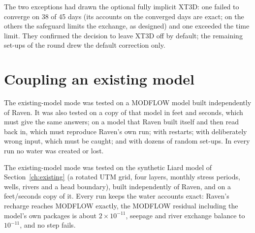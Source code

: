 The two exceptions had
drawn the optional fully implicit XT3D: one failed to converge on 38 of 45 days (its accounts on the converged days are
exact; on the others the safeguard limits the exchange, as designed) and one exceeded the time limit. They confirmed the
decision to leave XT3D off by default; the remaining set-ups of the round drew the default correction only.

\section{Coupling an existing model}\label{sec:vexisting}
\begin{plain}
The existing-model mode was tested on a MODFLOW model built independently of Raven. It was also tested on a copy of that
model in feet and seconds, which must give the same answers; on a model that Raven built itself and then read back in, which
must reproduce Raven's own run; with restarts; with deliberately wrong input, which must be caught; and with dozens of
random set-ups. In every run no water was created or lost.
\end{plain}
The existing-model mode was tested on the synthetic Liard model of Section~\ref{ch:existing} (a rotated UTM grid, four
layers, monthly stress periods, wells, rivers and a head boundary), built independently of Raven, and on a feet/seconds copy
of it. Every run keeps the water accounts exact: Raven's recharge reaches MODFLOW exactly, the MODFLOW residual including the
model's own packages is about $2\times10^{-11}$, seepage and river exchange balance to $10^{-11}$, and no step fails.

